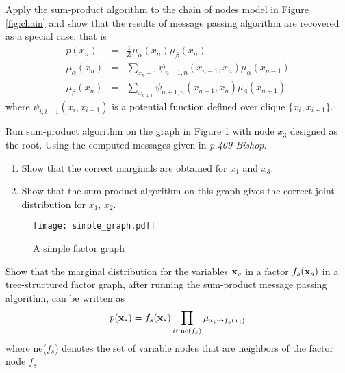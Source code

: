 \documentclass{amsmlaj}
\begin{document}
\begin{problem}
Apply the sum-product algorithm to the chain of nodes model in Figure \ref{fig:chain}  and show that the results of message passing algorithm are recovered as a special case, that is
\begin{eqnarray}
p(x_n) & = & \frac{1}{Z}\mu_\alpha(x_n)\mu_\beta(x_n) \nonumber\\
\mu_\alpha(x_n) & = & \sum\limits_{x_n-1} \psi_{n-1,n}(x_{n-1},x_n)\mu_\alpha(x_{n-1}) \nonumber\\
\mu_\beta(x_n) & = & \sum\limits_{x_{n+1}} \psi_{n+1,n}(x_{n+1},x_n)\mu_\beta(x_{n+1}) \nonumber
\end{eqnarray}
where $\psi_{i,i+1}(x_i,x_{i+1})$ is a potential function defined over clique $\{x_i,x_{i+1}\}$.
\end{problem}


\begin{problem}
Run sum-product algorithm on the graph in Figure \ref{fig:simplegraph} with node $x_3$ designed as the root. Using the computed messages given in \emph{p.409 Bishop}.
\begin{enumerate}
\item  Show that the correct marginals are obtained for $x_1$ and $x_3$.
\item Show that the sum-product algorithm on this graph gives the correct joint distribution for $x_1$, $x_2$.
\end{enumerate}

\begin{figure}[H]
\begin{center}
\texttt{[image: simple\_graph.pdf]}
\caption{A simple factor graph}
\label{fig:simplegraph}
\end{center}
\end{figure}

\end{problem}

\begin{problem}
Show that the marginal distribution for the variables $\bm{\mathbf{x}}_s$ in a factor $f_s(\bm{\mathbf{x}}_s)$ in a tree-structured factor graph, after running the sum-product message passing algorithm, can be written as
\[
p(\bm{\mathbf{x}}_s) = f_s(\bm{\mathbf{x}}_s) \prod\limits_{i \in \text{ne}(f_s)} \mu_{x_i \to f_s(x_i)}
\]
where ne($f_s$) denotes the set of variable nodes that are neighbors of the factor node $f_s$
\end{problem}
\end{document}
